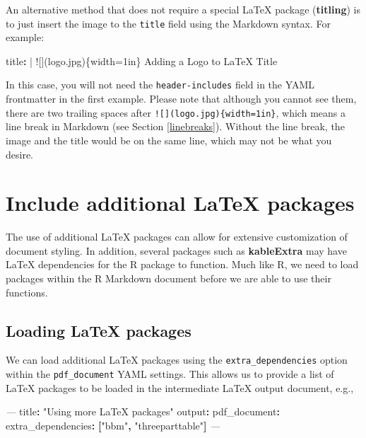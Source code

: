 \documentclass[
  11pt,
]{krantz}
\newenvironment{Shaded}{\begin{snugshade}}{\end{snugshade}}
\newcommand{\AttributeTok}[1]{\textcolor[rgb]{0.61,0.61,0.61}{#1}}
\newcommand{\CharTok}[1]{\textcolor[rgb]{0.5,0.5,0.5}{#1}}
\newcommand{\FunctionTok}[1]{\textcolor[rgb]{0,0,0}{#1}}
\newcommand{\KeywordTok}[1]{\textcolor[rgb]{0.27,0.27,0.27}{\textbf{#1}}}
\newcommand{\NormalTok}[1]{#1}
\newcommand{\PreprocessorTok}[1]{\textcolor[rgb]{0.37,0.37,0.37}{\textit{#1}}}
\newcommand{\StringTok}[1]{\textcolor[rgb]{0.5,0.5,0.5}{#1}}
\begin{document}
An alternative method that does not require a special LaTeX package (\textbf{titling}) is to just insert the image to the \texttt{title} field using the Markdown syntax. For example:

\begin{Shaded}
\begin{Highlighting}[]
\FunctionTok{title}\KeywordTok{: }\CharTok{|}
\NormalTok{  ![](logo.jpg)\{width=1in\}  }
\NormalTok{  Adding a Logo to LaTeX Title}
\end{Highlighting}
\end{Shaded}

In this case, you will not need the \texttt{header-includes} field in the YAML frontmatter in the first example. Please note that although you cannot see them, there are two trailing spaces after \texttt{!{[}{]}(logo.jpg)\{width=1in\}}, which means a line break in Markdown (see Section \ref{linebreaks}). Without the line break, the image and the title would be on the same line, which may not be what you desire.

\hypertarget{latex-extra}{%
\section{Include additional LaTeX packages}\label{latex-extra}}

The use of additional LaTeX packages can allow for extensive customization of document styling. In addition, several packages such as \textbf{kableExtra} \citep{R-kableExtra} may have LaTeX dependencies for the R package to function. Much like R, we need to load packages within the R Markdown document before we are able to use their functions.

\hypertarget{loading-latex-packages}{%
\subsection{Loading LaTeX packages}\label{loading-latex-packages}}

We can load additional LaTeX packages using the \texttt{extra\_dependencies} option within the \texttt{pdf\_document} YAML settings. This allows us to provide a list of LaTeX packages to be loaded in the intermediate LaTeX output document, e.g.,

\begin{Shaded}
\begin{Highlighting}[]
\PreprocessorTok{---}
\FunctionTok{title}\KeywordTok{:}\AttributeTok{ }\StringTok{"Using more LaTeX packages"}
\FunctionTok{output}\KeywordTok{:}\AttributeTok{ }
\AttributeTok{  }\FunctionTok{pdf_document}\KeywordTok{:}
\AttributeTok{    }\FunctionTok{extra_dependencies}\KeywordTok{:}\AttributeTok{ }\KeywordTok{[}\StringTok{"bbm"}\KeywordTok{,}\AttributeTok{ }\StringTok{"threeparttable"}\KeywordTok{]}
\PreprocessorTok{---}
\end{Highlighting}
\end{Shaded}
\end{document}
